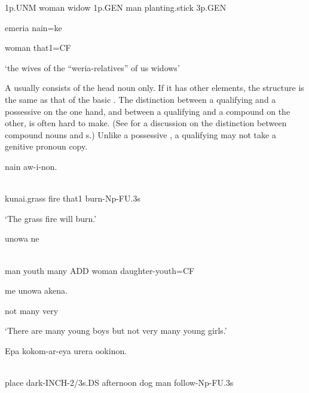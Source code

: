 1p.UNM  woman  widow  1p.GEN  man  planting.stick  3p.GEN

emeria  nain=ke

woman  that1=CF

`the wives of the ``weria-relatives'' of us widows'

A  usually consists of the head noun only. If it has other elements, the structure is the same as that of the basic . The distinction between a qualifying  and a possessive  on the one hand, and between a qualifying  and a  compound on the other, is often hard to make. (See   for a discussion on the distinction between compound nouns and s.) Unlike a possessive , a qualifying  may not take a genitive pronoun copy. 

\ea%
\label{ex:x413}
\gll {}  nain  aw-i-non. \\
      \\
\glt
\z

kunai.grass  fire  that1  burn-Np-FU.3s

`The grass fire will burn.'

\ea%
\label{ex:x412}
\gll {}    unowa  ne  \textstyleEmphasizedVernacularWords{=} \\
      \\
\glt
\z

man  youth  many  ADD  woman  daughter-youth=CF  

me  unowa  akena.

not  many  very

`There are many young boys but not very many young girls.'

\ea%
\label{ex:x1832}
\gll Epa  kokom-ar-eya  urera    ookinon. \\
      \\
\glt
\z

place  dark-INCH-2/3s.DS  afternoon  dog  man  follow-Np-FU.3s

